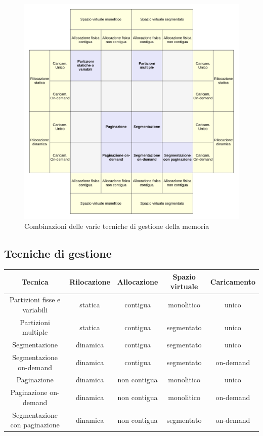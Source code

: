 \documentclass[12pt,a4paper]{article}
\begin{document}
\begin{figure}[H]
\centering
\includegraphics[width=16cm]{img/mem/TecnicheGestioneMemoria.pdf}
\caption{Combinazioni delle varie tecniche di gestione della memoria}
\label{fig:mem:tecniche-tabella}
\end{figure}

\subsection{Tecniche di gestione}
\begin{table}[H]
\begin{tabular}{| c | c | c | c | c |}\hline
  Tecnica                       & Rilocazione & Allocazione   & Spazio virtuale & Caricamento \\ \hline
  Partizioni fisse e variabili  & statica     & contigua      & monolitico      & unico       \\ \hline
  Partizioni multiple           & statica     & contigua      & segmentato      & unico       \\ \hline
  Segmentazione                 & dinamica    & contigua      & segmentato      & unico       \\ \hline
  Segmentazione on-demand       & dinamica    & contigua      & segmentato      & on-demand   \\ \hline
  Paginazione                   & dinamica    & non contigua  & monolitico      & unico       \\ \hline
  Paginazione on-demand         & dinamica    & non contigua  & monolitico      & on-demand   \\ \hline
  Segmentazione con paginazione & dinamica    & non contigua  & segmentato      & on-demand   \\ \hline
\end{tabular}
\end{table}
\end{document}
